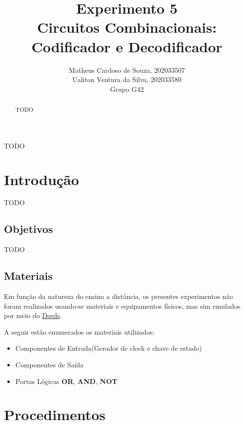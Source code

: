 \documentclass[12pt]{article}
\title{Experimento 5\\
Circuitos Combinacionais: Codificador e Decodificador}
\author{Matheus Cardoso de Souza, 202033507\\
        Ualiton Ventura da Silva, 202033580\\
        Grupo G42
}
\begin{document}
\maketitle

 \begin{abstract}
   TODO
 \end{abstract}

 \begin{resumo}
   TODO
 \end{resumo}


\section{Introdução}
\label{sec:Introducao}


TODO

\subsection{Objetivos}
\label{sec:Objetivos}

TODO

\subsection{Materiais}
\label{sec:Materiais}
Em função da natureza do ensino a distância, os presentes experimentos não foram
realizados usando-se materiais e equipamentos físicos, mas sim emulados por meio
do \href{https://www.digitalelectronicsdeeds.com/deeds.html}{Deeds}.

A seguir estão enumerados os materiais utilizados:
\begin{itemize}
    \item Componentes de Entrada(Gerador de clock e chave de estado)
    \item Componentes de Saída
    \item Portas Lógicas \textbf{OR}, \textbf{AND}, \textbf{NOT}
\end{itemize}

\section{Procedimentos}
\label{sec:Procedimentos}
\end{document}
